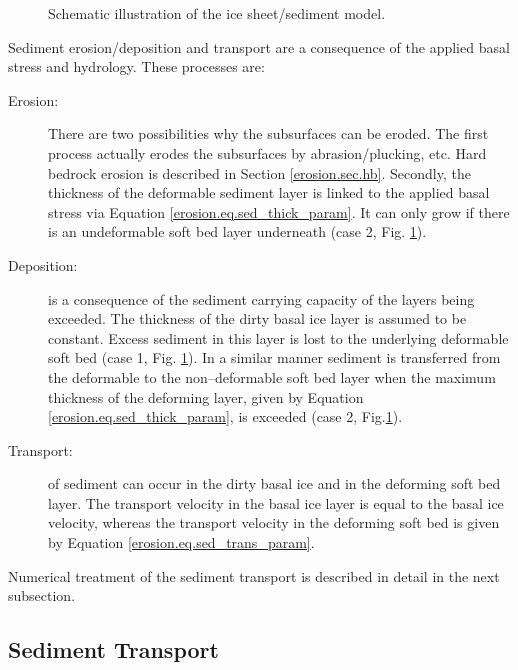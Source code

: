 \begin{figure}[htbp]
  \centering
  
  \caption{Schematic illustration of the ice sheet/sediment model.}
  \label{erosion.fig.ice_sed_model}
\end{figure}

Sediment erosion/deposition and transport are a consequence of the applied basal stress and hydrology. These processes are:
\begin{description}
\item[Erosion:] There are two possibilities why the subsurfaces can be eroded. The first process actually erodes the subsurfaces by abrasion/plucking, etc. Hard bedrock erosion is described in Section \ref{erosion.sec.hb}. Secondly, the thickness of the deformable sediment layer is linked to the applied basal stress via Equation \eqref{erosion.eq.sed_thick_param}. It can only grow if there is an undeformable soft bed layer underneath (case 2, Fig. \ref{erosion.fig.ice_sed_model}).
\item[Deposition:] is a consequence of the sediment carrying capacity of the layers being exceeded. The thickness of the dirty basal ice layer is assumed to be
constant. Excess sediment in this layer is lost to the underlying deformable soft bed (case 1, Fig. \ref{erosion.fig.ice_sed_model}). In a similar manner sediment is transferred from the deformable to the non--deformable soft bed layer when the maximum thickness of the deforming layer, given by Equation \eqref{erosion.eq.sed_thick_param}, is exceeded (case 2, Fig.\ref{erosion.fig.ice_sed_model}).
\item[Transport:] of sediment can occur in the dirty basal ice and in the deforming soft bed layer. The transport velocity in the basal ice layer is equal to the basal ice velocity, whereas the transport velocity in the deforming soft bed is given by Equation \eqref{erosion.eq.sed_trans_param}.
\end{description}
Numerical treatment of the sediment transport is described in detail in the next subsection.

\subsection{Sediment Transport}
